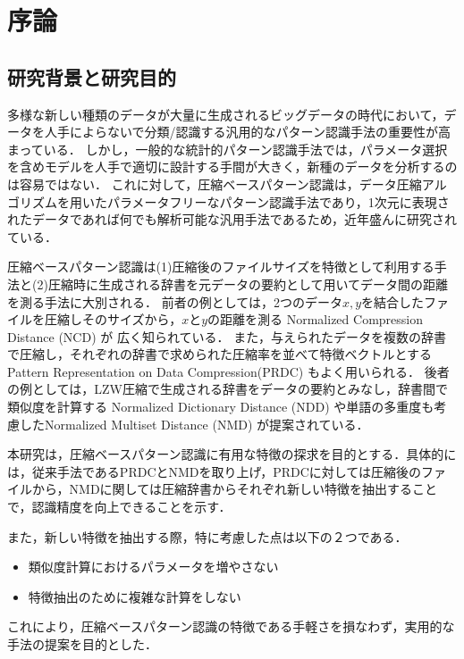 \chapter{序論}
\section{研究背景と研究目的} %
\label{sec:研究背景と研究目的}


多様な新しい種類のデータが大量に生成されるビッグデータの時代において，データを人手によらないで分類/認識する汎用的なパターン認識手法の重要性が高まっている．
しかし，一般的な統計的パターン認識手法では，パラメータ選択を含めモデルを人手で適切に設計する手間が大きく，新種のデータを分析するのは容易ではない．
これに対して，圧縮ベースパターン認識は，データ圧縮アルゴリズムを用いたパラメータフリーなパターン認識手法であり，1次元に表現されたデータであれば何でも解析可能な汎用手法であるため，近年盛んに研究されている．

圧縮ベースパターン認識は(1)圧縮後のファイルサイズを特徴として利用する手法と(2)圧縮時に生成される辞書を元データの要約として用いてデータ間の距離を測る手法に大別される．
前者の例としては，2つのデータ$x,y$を結合したファイルを圧縮しそのサイズから，$x$と$y$の距離を測る Normalized Compression Distance (NCD) \cite{NCD} が
広く知られている．
また，与えられたデータを複数の辞書で圧縮し，それぞれの辞書で求められた圧縮率を並べて特徴ベクトルとするPattern Representation on Data Compression(PRDC) \cite{PRDC} もよく用いられる．
後者の例としては，LZW圧縮で生成される辞書をデータの要約とみなし，辞書間で類似度を計算する Normalized Dictionary Distance (NDD) \cite{NDD}や単語の多重度も考慮したNormalized Multiset Distance (NMD) \cite{NMD}が提案されている．

本研究は，圧縮ベースパターン認識に有用な特徴の探求を目的とする．具体的には，従来手法であるPRDCとNMDを取り上げ，PRDCに対しては圧縮後のファイルから，NMDに関しては圧縮辞書からそれぞれ新しい特徴を抽出することで，認識精度を向上できることを示す．

また，新しい特徴を抽出する際，特に考慮した点は以下の２つである．
\begin{itemize}
	\item 類似度計算におけるパラメータを増やさない
	\item 特徴抽出のために複雑な計算をしない
\end{itemize}
これにより，圧縮ベースパターン認識の特徴である手軽さを損なわず，実用的な手法の提案を目的とした．


